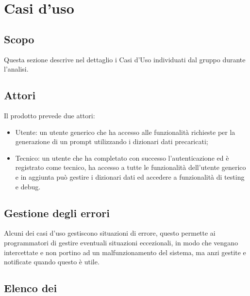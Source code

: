 \section{Casi d'uso}

\subsection{Scopo}
Questa sezione descrive nel dettaglio i Casi d’Uso individuati dal gruppo durante l'analisi.

\subsection{Attori}
Il prodotto prevede due attori:
\begin{itemize}
  \item Utente: un utente generico che ha accesso alle funzionalità richieste per la generazione di un prompt utilizzando i dizionari dati precaricati;
  \item Tecnico: un utente che ha completato con successo l'autenticazione ed è registrato come tecnico, ha accesso a tutte le funzionalità dell'utente generico e in aggiunta può gestire i dizionari dati ed accedere a funzionalità di testing e debug.
\end{itemize}

\subsection{Gestione degli errori}
Alcuni dei casi d'uso gestiscono situazioni di errore, questo permette ai programmatori di gestire eventuali situazioni eccezionali, in modo che vengano intercettate e non portino ad un malfunzionamento del sistema, ma anzi gestite e notificate quando questo è utile.

\subsection{Elenco dei }




















